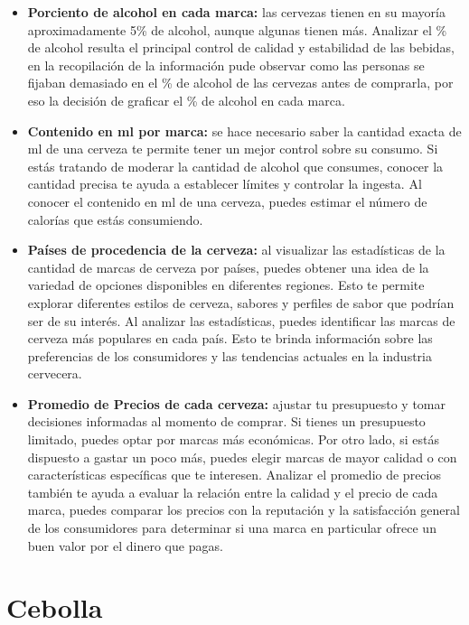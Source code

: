 \documentclass[a4paper, 12pt]{article}
\begin{document}
\begin{itemize}
    \item \textbf{Porciento de alcohol en cada marca:} las cervezas tienen en su mayoría aproximadamente 5\% de alcohol, aunque algunas tienen 
más. Analizar el \% de alcohol resulta el principal control de calidad y estabilidad de las bebidas, en la recopilación de la 
información pude observar como las personas se fijaban demasiado en el \% de alcohol de las cervezas 
antes de comprarla, por eso la decisión de graficar el \% de alcohol en cada marca.
    \item \textbf{Contenido en ml por marca:} se hace necesario saber la cantidad
    exacta de ml de una cerveza te permite tener un mejor control sobre su consumo. Si estás tratando 
    de moderar la cantidad de alcohol que consumes, conocer la cantidad precisa te ayuda a establecer 
    límites y controlar la ingesta. Al conocer el contenido en ml de una cerveza, puedes estimar el 
    número de calorías que estás consumiendo.
    \item \textbf{Países de procedencia de la cerveza:} al visualizar las estadísticas de la cantidad de marcas de cerveza por países, puedes obtener una 
idea de la variedad de opciones disponibles en diferentes regiones. Esto te permite explorar 
diferentes estilos de cerveza, sabores y perfiles de sabor que podrían ser de su interés. 
Al analizar las estadísticas, puedes identificar las marcas de cerveza más populares en cada país. 
Esto te brinda información sobre las preferencias de los consumidores y las tendencias actuales en 
la industria cervecera.
    \item \textbf{Promedio de Precios de cada cerveza:} ajustar tu presupuesto y tomar decisiones informadas al momento de comprar. Si tienes un presupuesto 
 limitado, puedes optar por marcas más económicas. Por otro lado, si estás dispuesto a gastar un poco 
 más, puedes elegir marcas de mayor calidad o con características específicas que te interesen. 
 Analizar el promedio de precios también te ayuda a evaluar la relación entre la calidad y el precio 
 de cada marca, puedes comparar los precios con la reputación y la satisfacción general de los 
 consumidores para determinar si una marca en particular ofrece un buen valor por el dinero que pagas.
\end{itemize}

\section{Cebolla}
\end{document}
